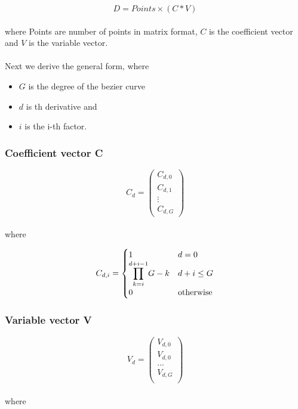 \begin{equation*}
    D=Points \times (C * V)
\end{equation*}
\\
where Points are number of points in matrix format, $C$ is the coefficient vector and $V$ is the variable vector.\\
\\
Next we derive the general form, where

\begin{itemize}
    \item $G$ is the degree of the bezier curve
    \item $d$ is th derivative and
    \item $i$ is the i-th factor.
\end{itemize}

\subsubsection{Coefficient vector C}

\begin{equation*}
    C_{d}=
    \left(
    \begin{array}{cccc}
            C_{d,0} \\
            C_{d,1} \\
            \vdots  \\
            C_{d,G}
        \end{array}
    \right)
\end{equation*}
\\
where

\begin{equation*}
    C_{d,i}=
    \begin{cases}
        1                                            & d=0              \\
        \mathlarger{\prod}_{k = i}^{d + i - 1} G - k & d + i \le G      \\
        0                                            & \text{otherwise}
    \end{cases}
\end{equation*}

\subsubsection{Variable vector V}

\begin{equation*}
    V_{d}=
    \left(
    \begin{array}{cccc}
            V_{d,0} \\
            V_{d,0} \\
            ...     \\
            V_{d,G} \\
        \end{array}
    \right)
\end{equation*}
\\
where

